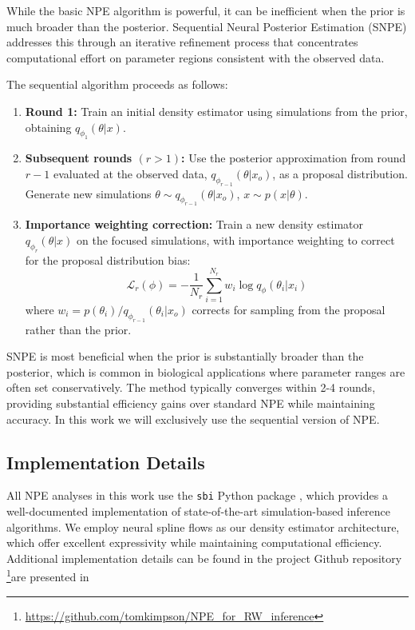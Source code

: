\documentclass{article}
\begin{document}
While the basic NPE algorithm is powerful, it can be inefficient when the prior is much broader than the posterior. Sequential Neural Posterior Estimation (SNPE) \citep{papamakarios2016fast, greenberg2019automatic} addresses this through an iterative refinement process that concentrates computational effort on parameter regions consistent with the observed data.

The sequential algorithm proceeds as follows:

\begin{enumerate}
	\item \textbf{Round 1:} Train an initial density estimator using simulations from the prior, obtaining $q_{\phi_1}(\theta | x)$.
	
	\item \textbf{Subsequent rounds $(r > 1)$:} Use the posterior approximation from round $r-1$ evaluated at the observed data, $q_{\phi_{r-1}}(\theta | x_o)$, as a proposal distribution. Generate new simulations $\theta \sim q_{\phi_{r-1}}(\theta | x_o)$, $x \sim p(x|\theta)$.
	
	\item \textbf{Importance weighting correction:} Train a new density estimator $q_{\phi_r}(\theta | x)$ on the focused simulations, with importance weighting to correct for the proposal distribution bias:
	\begin{equation}
		\mathcal{L}_r(\phi) = -\frac{1}{N_r} \sum_{i=1}^{N_r} w_i \log q_\phi(\theta_i | x_i)
	\end{equation}
	where $w_i = p(\theta_i) / q_{\phi_{r-1}}(\theta_i | x_o)$ corrects for sampling from the proposal rather than the prior.
\end{enumerate}

SNPE is most beneficial when the prior is substantially broader than the posterior, which is common in biological applications where parameter ranges are often set conservatively. The method typically converges within 2-4 rounds, providing substantial efficiency gains over standard NPE while maintaining accuracy. In this work we will exclusively use the sequential version of NPE.

\subsection{Implementation Details}

All NPE analyses in this work use the \texttt{sbi} Python package \cite{2020JOSS....5.2505T}, which provides a well-documented implementation of state-of-the-art simulation-based inference algorithms. We employ neural spline flows \cite{durkan2019neural} as our density estimator architecture, which offer excellent expressivity while maintaining computational efficiency. Additional implementation details can be found in the project Github repository \footnote{\href{github.com/tomkimpson/NPE_for_RW_inference}{https://github.com/tomkimpson/NPE\_for\_RW\_inference}}are presented in 
\end{document}
